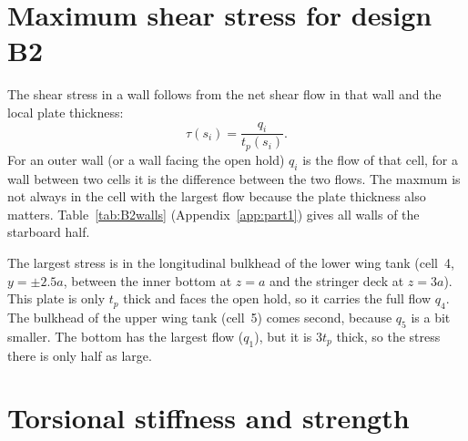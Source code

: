 
\section{Maximum shear stress for design B2}
\label{sec:a2-3}

The shear stress in a wall follows from the net shear flow in that wall and the local plate thickness:
\begin{equation}
    \tau(s_i) = \frac{q_i}{t_p(s_i)} .
    \label{eq:shear_stress}
\end{equation}
For an outer wall (or a wall facing the open hold) $q_i$ is the flow of that cell, for a wall between two cells it is the difference between the two flows. The maxmum is not always in the cell with the largest flow because the plate thickness also matters. Table~\ref{tab:B2walls} (Appendix~\ref{app:part1}) gives all walls of the starboard half.

The largest stress is in the longitudinal bulkhead of the lower wing tank (cell~4, $y=\pm2.5a$, between the inner bottom at $z=a$ and the stringer deck at $z=3a$). This plate is only $t_p$ thick and faces the open hold, so it carries the full flow $q_4$. The bulkhead of the upper wing tank (cell~5) comes second, because $q_5$ is a bit smaller. The bottom has the largest flow ($q_1$), but it is $3t_p$ thick, so the stress there is only half as large.


\section{Torsional stiffness and strength}
\label{sec:a2-4}

